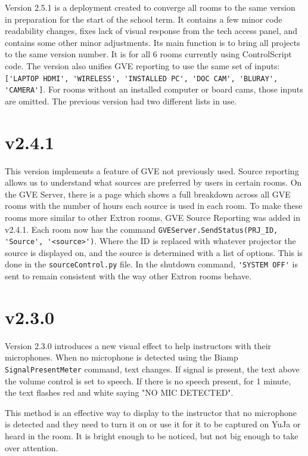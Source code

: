 \documentclass{article}
\begin{document}
Version 2.5.1 is a deployment created to converge all rooms to the same version in preparation for the start of the school 
term. It contains a few minor code readability changes, fixes lack of visual response from the tech access panel, and 
contains some other minor adjustments. Its main function is to bring all projects to the same version number. It is for 
all 6 rooms currently using ControlScript code. The version also unifies GVE reporting to use the same set of inputs: 
\lstinline|['LAPTOP HDMI', 'WIRELESS', 'INSTALLED PC', 'DOC CAM', 'BLURAY', 'CAMERA']|. For rooms without an installed 
computer or board cams, those inputs are omitted. The previous version had two different lists in use.

\section*{v2.4.1}

This version implements a feature of GVE not previously used. Source reporting allows us to understand what sources 
are preferred by users in certain rooms. On the GVE Server, there is a page which shows a full breakdown across all GVE
rooms with the number of hours each source is used in each room. To make these rooms more similar to other Extron rooms, 
GVE Source Reporting was added in v2.4.1. Each room now has the command \lstinline|GVEServer.SendStatus(PRJ_ID, 'Source', '<source>')|.
Where the ID is replaced with whatever projector the source is displayed on, and the source is determined with a list of options. 
This is done in the \lstinline|sourceControl.py| file. In the shutdown command, \lstinline|'SYSTEM OFF'| is sent to remain 
consistent with the way other Extron rooms behave. 

\section*{v2.3.0}

Version 2.3.0 introduces a new visual effect to help instructors with their microphones. When no microphone is detected
using the Biamp \lstinline|SignalPresentMeter| command, text changes. If signal is present, the text above the volume control 
is set to speech. If there is no speech present, for 1 minute, the text flashes red and white saying "NO MIC DETECTED". 

This method is an effective way to display to the instructor that no microphone is detected and they need to turn it on 
or use it for it to be captured on YuJa or heard in the room. It is bright enough to be noticed, but not big enough to 
take over attention. 
\end{document}
